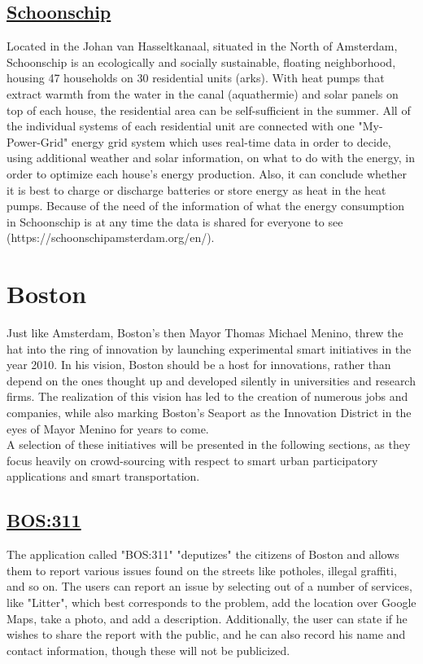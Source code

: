 \documentclass[a4paper,12pt]{report}
\begin{document}
		\subsection[Schoonschip]{\href{https://schoonschipamsterdam.org/en/}{Schoonschip}} \label{Schoonschipp}
		\startsubsection
			Located in the Johan van Hasseltkanaal, situated in the North of Amsterdam, Schoonschip is an ecologically and socially sustainable, floating neighborhood, housing 47 households on 30 residential units (arks). With heat pumps that extract warmth from the water in the canal (aquathermie) and solar panels on top of each house, the residential area can be self-sufficient in the summer. All of the individual systems of each residential unit are connected with one "My-Power-Grid" energy grid system which uses real-time data in order to decide, using additional weather and solar information, on what to do with the energy, in order to optimize each house's energy production. Also, it can conclude whether it is best to charge or discharge batteries or store energy as heat in the heat pumps. Because of the need of the information of what the energy consumption in Schoonschip is at any time the data is shared for everyone to see (https://schoonschipamsterdam.org/en/).
		\closesection
	\closesection
	
	\section[Boston]{Boston \cite{SmartCityBoston}}
	\startsection
		Just like Amsterdam, Boston's then Mayor Thomas Michael Menino, threw the hat into the ring of innovation by launching experimental smart initiatives in the year 2010. In his vision, Boston should be a host for innovations, rather than depend on the ones thought up and developed silently in universities and research firms. The realization of this vision has led to the creation of numerous jobs and companies, while also marking Boston's Seaport as the Innovation District in the eyes of Mayor Menino for years to come.\\
		A selection of these initiatives will be presented in the following sections, as they focus heavily on crowd-sourcing with respect to smart urban participatory applications and smart transportation.
		\subsection[BOS:311]{\href{https://311.boston.gov/}{BOS:311}}
		\startsubsection
		The application called "BOS:311" "deputizes" the citizens of Boston and allows them to report various issues found on the streets like potholes, illegal graffiti, and so on. The users can report an issue by selecting out of a number of services, like "Litter", which best corresponds to the problem, add the location over Google Maps, take a photo, and add a description. Additionally, the user can state if he wishes to share the report with the public, and he can also record his name and contact information, though these will not be publicized. 
		\closesection		
\end{document}
